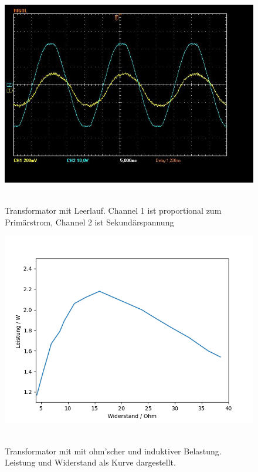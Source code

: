 \documentclass{article}
\begin{document}
\begin{figure}[H]
\caption{Transformator mit Leerlauf. Channel 1 ist proportional zum Primärstrom, Channel 2 ist Sekundärspannung}
\label{fig:task1}
{\centering
\includegraphics[scale=0.4]{task2.jpg}
~
}
\end{figure}

\begin{figure}[H]
\caption{Transformator mit mit ohm'scher und induktiver Belastung. Leistung und Widerstand als Kurve dargestellt.}
\label{fig:task1}
{\centering
\includegraphics[scale=0.7]{kurve.png}
~
}
\end{figure}






\appendix
\end{document}
